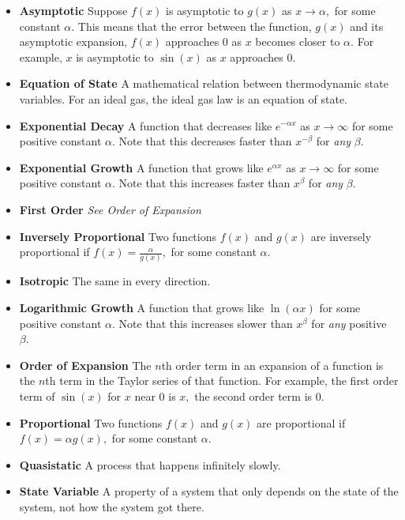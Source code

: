 \documentclass[12pt]{book}
\begin{document}
\begin{itemize}

\item[] {\bf Asymptotic} Suppose $f(x)$ is asymptotic to $g(x)$ as $x\to\alpha,$ for some constant $\alpha.$ This means that the error between the function, $g(x)$ and its asymptotic expansion, $f(x)$ approaches 0 as $x$ becomes closer to $\alpha.$ For example, $x$ is asymptotic to $\sin(x)$ as $x$ approaches 0.

\item[] {\bf Equation of State} A mathematical relation between thermodynamic state variables. For an ideal gas, the ideal gas law is an equation of state.

\item[] {\bf Exponential Decay} A function that decreases like $e^{-\alpha x}$ as $x\to\infty$ for some positive constant $\alpha.$ Note that this decreases faster than $x^{-\beta}$ for {\it any} $\beta.$

\item[] {\bf Exponential Growth} A function that grows like $e^{\alpha x}$ as $x\to\infty$ for some positive constant $\alpha.$ Note that this increases faster than $x^{\beta}$ for {\it any} $\beta.$ 

\item[] {\bf First Order} {\it See Order of Expansion}

\item[] {\bf Inversely Proportional} Two functions $f(x)$ and $g(x)$ are inversely proportional if $f(x) = \frac{\alpha}{g(x)},$ for some constant $\alpha.$ 

\item[] {\bf Isotropic} The same in every direction.

\item[] {\bf Logarithmic Growth} A function that grows like $\ln(\alpha x)$ for some positive constant $\alpha.$ Note that this increases slower than $x^{\beta}$ for {\it any} positive $\beta.$

\item[] {\bf Order of Expansion} The $n$th order term in an expansion of a function is the $n$th term in the Taylor series of that function. For example, the first order term of $\sin(x)$ for $x$ near 0 is $x,$ the second order term is 0.

\item[] {\bf Proportional} Two functions $f(x)$ and $g(x)$ are proportional if $f(x) = \alpha g(x),$ for some constant $\alpha.$

\item[] {\bf Quasistatic} A process that happens infinitely slowly.

\item[] {\bf State Variable} A property of a system that only depends on the state of the system, not how the system got there.

\end{itemize}
\end{document}
